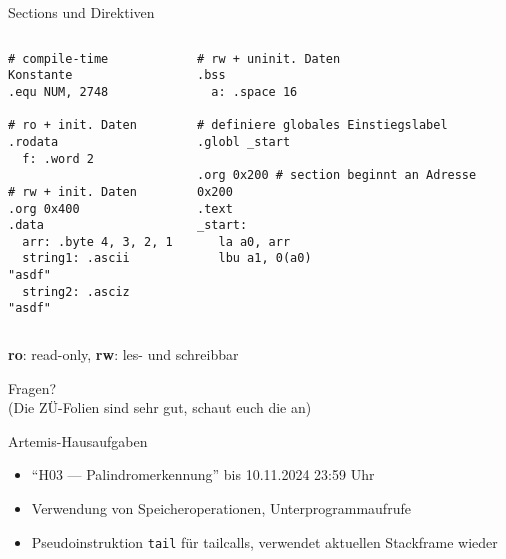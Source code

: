 \documentclass[
  german,            %
  aspectratio=169,    %
]{tumbeamer}
\begin{document}
\begin{frame}[c, fragile]{Sections und Direktiven}
  \begin{columns}[c]
    \begin{column}{0.5\textwidth}
      \begin{verbatim}
# compile-time Konstante
.equ NUM, 2748 

# ro + init. Daten
.rodata
  f: .word 2

# rw + init. Daten
.org 0x400
.data
  arr: .byte 4, 3, 2, 1
  string1: .ascii "asdf"
  string2: .asciz "asdf"

        \end{verbatim}
    \end{column}
    \begin{column}{0.5\textwidth}
      \begin{verbatim}
# rw + uninit. Daten
.bss
  a: .space 16

# definiere globales Einstiegslabel
.globl _start

.org 0x200 # section beginnt an Adresse 0x200
.text
_start:
   la a0, arr
   lbu a1, 0(a0)
      \end{verbatim}
    \end{column}
  \end{columns}
  \begin{center}
  \small{\textbf{ro}: read-only, \textbf{rw}: les- und schreibbar}
  \end{center}
\end{frame}


\begin{frame}[c]{}{}
  \begin{center}
    \LARGE Fragen?\\
    \Large (Die ZÜ-Folien sind sehr gut, schaut euch die an)
  \end{center}
\end{frame}

\begin{frame}[c, fragile]{Artemis-Hausaufgaben}{}
  \begin{itemize}
    \item \enquote{H03 --- Palindromerkennung} bis 10.11.2024 23:59 Uhr
    \item Verwendung von Speicheroperationen, Unterprogrammaufrufe
    \item Pseudoinstruktion \verb|tail| für tailcalls, verwendet aktuellen Stackframe wieder
  \end{itemize}
\end{frame}
\end{document}
